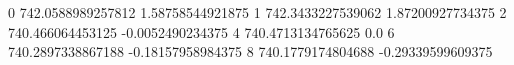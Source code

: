0 742.0588989257812 1.58758544921875
1 742.3433227539062 1.87200927734375
2 740.466064453125 -0.0052490234375
4 740.4713134765625 0.0
6 740.2897338867188 -0.18157958984375
8 740.1779174804688 -0.29339599609375
